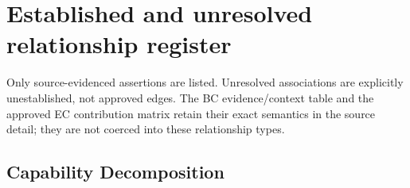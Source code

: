 \chapter{Established and unresolved relationship register}\label{model:relationships}
Only source-evidenced assertions are listed. Unresolved associations are explicitly unestablished, not approved edges. The BC evidence/context table and the approved EC contribution matrix retain their exact semantics in the source detail; they are not coerced into these relationship types.

\section{Capability Decomposition}
\begingroup\small\setlength{\TableWidth}{\dimexpr\linewidth-6\tabcolsep-4\arrayrulewidth\relax}
